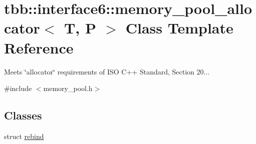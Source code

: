 \hypertarget{classtbb_1_1interface6_1_1memory__pool__allocator}{}\section{tbb\+:\+:interface6\+:\+:memory\+\_\+pool\+\_\+allocator$<$ T, P $>$ Class Template Reference}
\label{classtbb_1_1interface6_1_1memory__pool__allocator}


Meets \char`\"{}allocator\char`\"{} requirements of I\+S\+O C++ Standard, Section 20...  




{\ttfamily \#include $<$memory\+\_\+pool.\+h$>$}

\subsection*{Classes}
\begin{DoxyCompactItemize}
\item 
struct \hyperlink{structtbb_1_1interface6_1_1memory__pool__allocator_1_1rebind}{rebind}
\end{DoxyCompactItemize}
